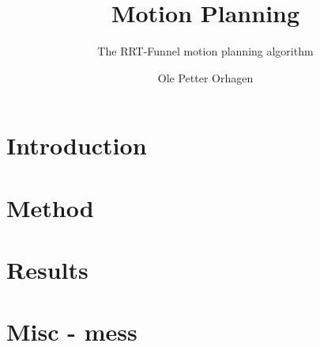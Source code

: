 \documentclass[a4paper, oneside, final, showtrims]{memoir}
\title{Motion Planning}
\author{Ole Petter Orhagen}
\subtitle{The RRT-Funnel motion planning algorithm}
\begin{document}
    \mnfrontpage{}
    \frontmatter        %
    
    
    
    \cleartorecto{}
    \tableofcontents    %
    \cleartorecto{}
    \listoffigures      %
    \cleartorecto{}
    \listoftables       %
    \mainmatter{}       %
    \part{Introduction}
    
    
    
    
    \part{Method}
    
    \part{Results}
    
    
    
    \part{Misc - mess}
    \appendix           %
    \appendixpage       %
    
    
    \backmatter         %
    \printbibliography
\end{document}
